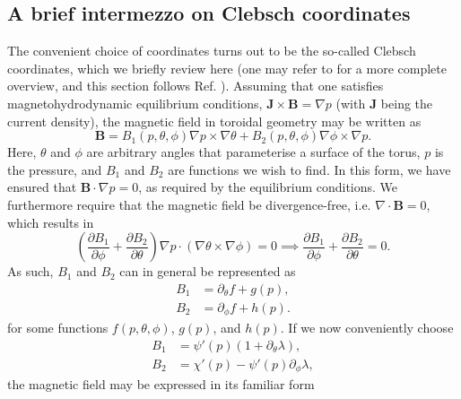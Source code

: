 \subsection{A brief intermezzo on Clebsch coordinates}
The convenient choice of coordinates turns out to be the so-called Clebsch coordinates, which we briefly review here (one may refer to \citet{d2012flux} for a more complete overview, and this section follows Ref. \cite{helander2014theory}). Assuming that one satisfies magnetohydrodynamic equilibrium conditions, $\boldsymbol{J} \times \boldsymbol{B} = \nabla  p$ (with $\boldsymbol{J}$ being the current density), the magnetic field in toroidal geometry may be written as
\begin{equation}
    \boldsymbol{B} = B_1(p,\theta,\phi) \nabla p \times \nabla \theta + B_2(p,\theta,\phi) \nabla \phi \times \nabla p.
\end{equation}
Here, $\theta$ and $\phi$ are arbitrary angles that parameterise a surface of the torus, $p$ is the pressure, and $B_1$ and $B_2$ are functions we wish to find. In this form, we have ensured that $\boldsymbol{B} \cdot \nabla p = 0$, as required by the equilibrium conditions. We furthermore require that the magnetic field be divergence-free, i.e. $\nabla \cdot \boldsymbol{B} = 0$, which results in 
\begin{equation}
    \left( \frac{\partial B_1}{\partial \phi} + \frac{\partial B_2}{\partial \theta} \right) \nabla p \cdot \left( \nabla \theta \times \nabla \phi \right) = 0 \implies \frac{\partial B_1}{\partial \phi} + \frac{\partial B_2}{\partial \theta} = 0.
\end{equation}
As such, $B_1$ and $B_2$ can in general be represented as 
\begin{subequations}
\begin{alignat}{4}
B_1 &= \partial_\theta f + g(p), \\
B_2 &= \partial_\phi f   + h(p).
\end{alignat}
\end{subequations}
for some functions $f(p,\theta,\phi)$, $g(p)$, and $h(p)$. If we now conveniently choose
\begin{subequations}
\begin{alignat}{4}
B_1 &= \psi'(p) \left( 1 + \partial_\theta \lambda \right), \\
B_2 &= \chi'(p) - \psi'(p) \partial_\phi \lambda,
\end{alignat}
\end{subequations}
the magnetic field may be expressed in its familiar form
